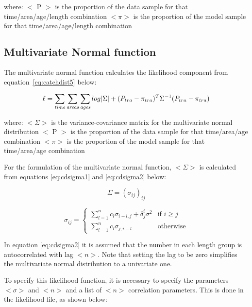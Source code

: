 \documentclass [a4paper, 10pt]{book}
\begin{document}
where:\newline
$<$ P $>$ is the proportion of the data sample for that time/area/age/length combination\newline
$<\pi>$ is the proportion of the model sample for that time/area/age/length combination

\subsection{Multivariate Normal function}
The multivariate normal function calculates the likelihood component from equation~\ref{eq:catchdist5} below:

\begin{equation}\label{eq:catchdist5}
\ell = \sum_{\it time}\sum_{\it areas}\sum_{\it ages} log|\Sigma|+(P_{tra}-\pi_{tra})^T \Sigma^{-1}(P_{tra}-\pi_{tra})
\end{equation}

where:\newline
$<\Sigma>$ is the variance-covariance matrix for the multivariate normal distribution\newline
$<$ P $>$ is the proportion of the data sample for that time/area/age combination\newline
$<\pi>$ is the proportion of the model sample for that time/area/age combination

\bigskip
For the formulation of the multivariate normal function, $<\Sigma>$ is calculated from equations \ref{eq:cdsigma1} and \ref{eq:cdsigma2} below:

\begin{equation}\label{eq:cdsigma1}
\Sigma = (\sigma_{ij})_{ij}
\end{equation}

\begin{equation}\label{eq:cdsigma2}
\sigma_{ij} =
\begin{cases}
  \sum^n_{l=1} c_l \sigma_{i-l,j} + \delta^i_{j} \sigma^2
  & \textrm{if $i \geq j$}\\
  \sum^n_{l=1} c_l \sigma_{j,i-l}
  & \textrm{otherwise}
\end{cases}
\end{equation}

In equation \ref{eq:cdsigma2} it is assumed that the number in each length group is autocorrelated with lag $< n >$.  Note that setting the lag to be zero simplifies the multivariate normal distribution to a univariate one.

\bigskip
To specify this likelihood function, it is necessary to specify the parameters $<\sigma>$ and $< n >$ and a list of $< n >$ correlation parameters.  This is done in the likelihood file, as shown below:
\end{document}
